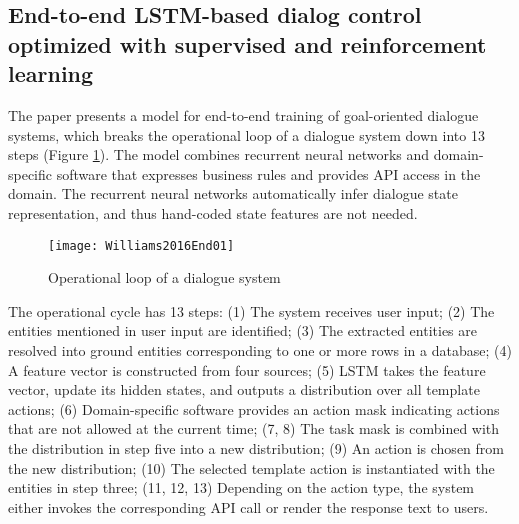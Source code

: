 \subsection{End-to-end LSTM-based dialog control optimized with supervised and reinforcement learning \cite{Williams2016End}}

The paper presents a model for end-to-end training of goal-oriented dialogue systems, which breaks the operational loop of a dialogue system down into 13 steps (Figure \ref{fig:Williams2016End01}). The model combines recurrent neural networks and domain-specific software that expresses business rules and provides API access in the domain. The recurrent neural networks automatically infer dialogue state representation, and thus hand-coded state features are not needed.

\begin{figure}[htbp]
  \centering
  \texttt{[image: Williams2016End01]}\\
  \caption{Operational loop of a dialogue system}\label{fig:Williams2016End01}
\end{figure}

The operational cycle has 13 steps: (1) The system receives user input; (2) The entities mentioned in user input are identified; (3) The extracted entities are resolved into ground entities corresponding to one or more rows in a database; (4) A feature vector is constructed from four sources; (5) LSTM takes the feature vector, update its hidden states, and outputs a distribution over all template actions; (6) Domain-specific software provides an action mask indicating actions that are not allowed at the current time; (7, 8) The task mask is combined with the distribution in step five into a new distribution; (9) An action is chosen from the new distribution; (10) The selected template action is instantiated with the entities in step three; (11, 12, 13) Depending on the action type, the system either invokes the corresponding API call or render the response text to users. 